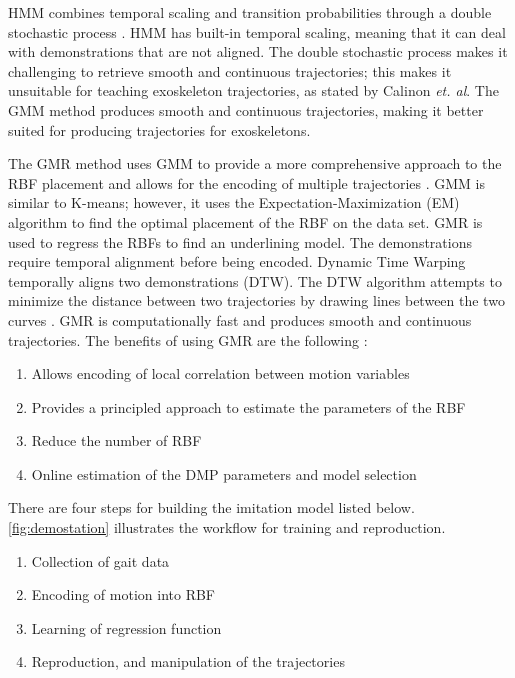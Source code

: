 HMM combines temporal scaling and transition probabilities through a double stochastic process \cite{calinon2007learning}. HMM has built-in temporal scaling, meaning that it can deal with demonstrations that are not aligned. The double stochastic process makes it challenging to retrieve smooth and continuous trajectories; this makes it unsuitable for teaching exoskeleton trajectories, as stated by Calinon \textit{et. al}. The GMM method produces smooth and continuous trajectories, making it better suited for producing trajectories for exoskeletons. 

The GMR method uses GMM to provide a more comprehensive approach to the RBF placement and allows for the encoding of multiple trajectories \cite{calinon2013compliant}. GMM is similar to K-means; however, it uses the Expectation-Maximization (EM) algorithm to find the optimal placement of the RBF on the data set. GMR is used to regress the RBFs to find an underlining model. The demonstrations require temporal alignment before being encoded. Dynamic Time Warping temporally aligns two demonstrations (DTW). The DTW algorithm attempts to minimize the distance between two trajectories by drawing lines between the two curves \cite{muller2007dynamic} \cite{JSSv031i07}. 
 GMR is computationally fast and produces smooth and continuous trajectories. The benefits of using GMR are the following \cite{Calinon}: 


\begin{enumerate}[noitemsep]
    \item Allows encoding of local correlation between motion variables
    \item Provides a principled approach to estimate the parameters of the RBF 
    \item Reduce the number of RBF   
    \item Online estimation of the DMP parameters and model selection   
\end{enumerate}  

There are four steps for building the imitation model listed below. \autoref{fig:demostation} illustrates the workflow for training and reproduction.

\begin{enumerate}[noitemsep]
    \item Collection of gait data
    \item Encoding of motion into RBF
    \item Learning of regression function
    \item Reproduction, and manipulation of the trajectories
\end{enumerate}


